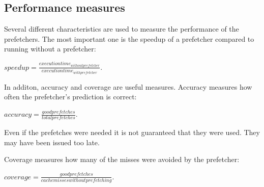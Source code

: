 \subsection{Performance measures}
Several different characteristics are used to measure the performance
of the prefetchers. The most important one is the speedup of a
prefetcher compared to running without a prefetcher:

$speedup = \frac{execution time_{without prefetcher}}{execution time_{with prefetcher}}$.

In additon, accuracy and coverage are useful measures. Accuracy measures
how often the prefetcher's prediction is correct:

$accuracy = \frac{good prefetches}{total prefetches}$.

Even if the prefetches were needed it is not guaranteed that they
were used. They may have been issued too late.

Coverage measures how many of the misses were avoided by the
prefetcher:

$coverage = \frac{good prefetches}{cache misses without prefetching}$.

\cite{bib:doc}
